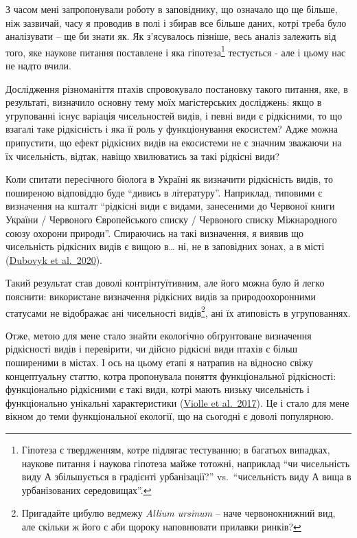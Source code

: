 \documentclass[
  11pt,
]{book}
\begin{document}
З часом мені запропонували роботу в заповіднику, що означало що ще більше, ніж зазвичай, часу я проводив в полі і збирав все більше даних, котрі треба було аналізувати -- ще би знати як. Як з'ясувалось пізніше, весь аналіз залежить від того, яке наукове питання поставлене і яка гіпотеза\footnote{Гіпотеза є твердженням, котре підлягає тестуванню; в багатьох випадках, наукове питання і наукова гіпотеза майже тотожні, наприклад ``чи чисельність виду А збільшується в градієнті урбанізації?'' vs.~``чисельність виду А вища в урбанізованих середовищах''.} тестується - але і цьому нас не надто вчили.

Дослідження різноманіття птахів спровокувало постановку такого питання, яке, в результаті, визначило основну тему моїх магістерських досліджень: якщо в угрупованні існує варіація чисельностей видів, і певні види є рідкісними, то що взагалі таке рідкісність і яка її роль у функціонування екосистем? Адже можна припустити, що ефект рідкісних видів на екосистеми не є значним зважаючи на їх чисельність, відтак, навіщо хвилюватись за такі рідкісні види?

Коли спитати пересічного біолога в Україні як визначити рідкісність видів, то поширеною відповіддю буде ``дивись в літературу''. Наприклад, типовими є визначення на кшталт ``рідкісні види є видами, занесеними до Червоної книги України / Червоного Європейського списку / Червоного списку Міжнародного союзу охорони природи''. Спираючись на такі визначення, я виявив що чисельність рідкісних видів є вищою в\ldots{} ні, не в заповідних зонах, а в місті (\href{http://doi.org/10.15407/gb1904}{Dubovyk et al.~2020}).

Такий результат став доволі контрінтуїтивним, але його можна було й легко пояснити: використане визначення рідкісних видів за природоохоронними статусами не відображає ані чисельності видів\footnote{Пригадайте цибулю ведмежу \emph{Allium ursinum} -- наче червонокнижний вид, але скільки ж його є аби щороку наповнювати прилавки ринків?}, ані їх атиповість в угрупованнях.

Отже, метою для мене стало знайти екологічно обґрунтоване визначення рідкісності видів і перевірити, чи дійсно рідкісні види птахів є більш поширеними в містах. І ось на цьому етапі я натрапив на відносно свіжу концептуальну статтю, котра пропонувала поняття функціональної рідкісності: функціонально рідкісними є такі види, котрі мають низьку чисельність і функціонально унікальні характеристики (\href{https://doi.org/10.1016/j.tree.2017.02.002}{Violle et al.~2017}). Це і стало для мене вікном до теми функціональної екології, що на сьогодні є доволі популярною.
\end{document}
